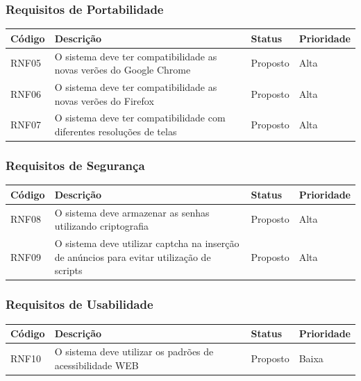 \documentclass[a4paper, 12pt]{article}
\begin{document}
\subsubsection{Requisitos de Portabilidade}
\begin{table}[ht]
	\centering

	\begin{tabular}{p{2cm}p{7cm}p{2cm}p{2cm}}
		\hline
		\cellcolor{gray}Código&\cellcolor{gray}Descrição&\cellcolor{gray}Status&\cellcolor{gray}Prioridade  \\
		\hline
		RNF05&O sistema deve ter compatibilidade as novas ver\~{o}es do Google Chrome&Proposto&Alta\\
        RNF06&O sistema deve ter compatibilidade as novas ver\~{o}es do Firefox&Proposto&Alta\\
        RNF07&O sistema deve ter compatibilidade com diferentes resolu\c{c}\~{o}es de telas&Proposto&Alta\\
		\hline
	\end{tabular}
\end{table}%
\subsubsection{Requisitos de Segurança}
\begin{table}[ht]
	\rowcolors{1}{}{}
	\centering

	\begin{tabular}{p{2cm}p{7cm}p{2cm}p{2cm}}
		\hline
		\cellcolor{gray}Código&\cellcolor{gray}Descrição&\cellcolor{gray}Status&\cellcolor{gray}Prioridade  \\
		\hline
		RNF08&O sistema deve armazenar as senhas utilizando criptografia&Proposto&Alta\\
        RNF09&O sistema deve utilizar captcha na inser\c{c}\~{a}o de an\'{u}ncios para evitar utiliza\c{c}\~{a}o de scripts&Proposto&Alta\\
		\hline
	\end{tabular}
\end{table}%
\subsubsection{Requisitos de Usabilidade}
\begin{table}[ht]
	\centering

	\begin{tabular}{p{2cm}p{7cm}p{2cm}p{2cm}}
		\hline
		\cellcolor{gray}Código&\cellcolor{gray}Descrição&\cellcolor{gray}Status&\cellcolor{gray}Prioridade  \\
		\hline
		RNF10&O sistema deve utilizar os padr\~{o}es de acessibilidade WEB&Proposto&Baixa\\
		\hline
	\end{tabular}
\end{table}%
\end{document}
